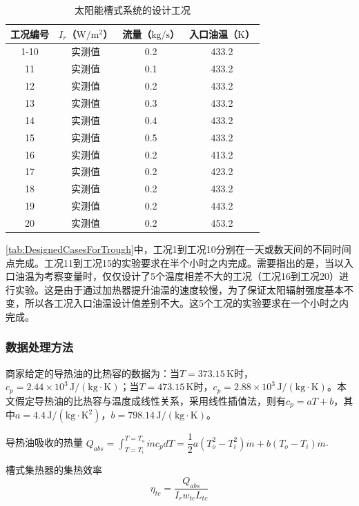 \begin{table}[htbp]
	\caption{太阳能槽式系统的设计工况}
	\centering
	\begin{tabular}{cccc}
		\toprule
		工况编号	& $I_r$（$\mathrm{W/m^2}$）&	流量（$\mathrm{kg/s}$）			&	入口油温（$\mathrm{K}$）\\
		\midrule
		1-10	&	实测值	&	0.2	&	433.2\\
		11	&	实测值	&	0.1	&	433.2\\
		12	&	实测值	&	0.2	&	433.2\\
		13	&	实测值	&	0.3	&	433.2\\
		14	&	实测值	&	0.4	&	433.2\\
		15	&	实测值	&	0.5	&	433.2\\
		16	&	实测值	&	0.2	&	413.2\\
		17	&	实测值	&	0.2	&	423.2\\
		18	&	实测值	&	0.2	&	433.2\\
		19	&	实测值	&	0.2	&	443.2\\
		20	&	实测值	&	0.2	&	453.2\\
		\bottomrule
	\end{tabular}
	\label{tab:DesignedCasesForTrough}
\end{table}

\autoref{tab:DesignedCasesForTrough}中，工况1到工况10分别在一天或数天间的不同时间点完成。工况11到工况15的实验要求在半个小时之内完成。需要指出的是，当以入口油温为考察变量时，仅仅设计了5个温度相差不大的工况（工况16到工况20）进行实验。这是由于通过加热器提升油温的速度较慢，为了保证太阳辐射强度基本不变，所以各工况入口油温设计值差别不大。这5个工况的实验要求在一个小时之内完成。

\subsubsection{数据处理方法}
商家给定的导热油的比热容的数据为：当$T = 373.15\,\mathrm{K}$时，$c_p = 2.44\times10^3\,\mathrm{J/(kg\cdot K)}$；当$T = 473.15\,\mathrm{K}$时，$c_p = 2.88\times10^3\,\mathrm{J/(kg\cdot K)}$。本文假定导热油的比热容与温度成线性关系，采用线性插值法，则有$c_p = aT + b$，其中$a = 4.4\,\mathrm{J/(kg \cdot K^2)}$，$b = 798.14\,\mathrm{J/(kg\cdot K)}$。

导热油吸收的热量 $Q_{abs} = \int_{T=T_i}^{T = T_o}\dot{m}c_pdT = \dfrac{1}{2}a(T_o^2 - T_i^2)\dot{m} + b (T_o - T_i)\dot{m}$.

槽式集热器的集热效率
\begin{equation}
	\eta_{tc} = \dfrac{Q_{abs}}{I_rw_{tc}L_{tc}}
	\label{eq:ExperimentEta}
\end{equation}

